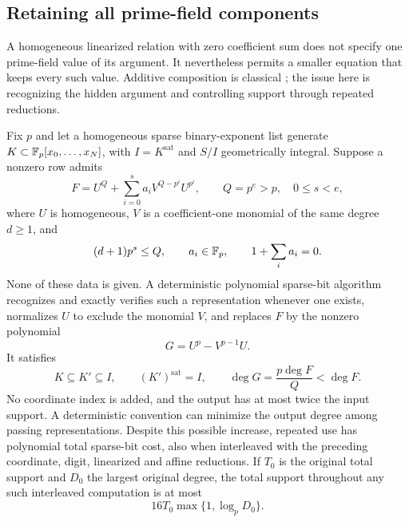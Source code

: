 \subsection{Retaining all prime-field components}
A homogeneous linearized relation with zero coefficient sum does not
specify one prime-field value of its argument. It nevertheless permits
a smaller equation that keeps every such value. Additive composition
is classical \citep[\S6]{sp-giesbrecht}; the issue here is recognizing
the hidden argument and controlling support through repeated reductions.

\begin{theorem}
\label{sp:thm:zero-sum-preprocessing}
Fix $p$ and let a homogeneous sparse binary-exponent list generate
$K\subset\mathbb F_p[x_0,\ldots,x_N]$, with $I=K^{\mathrm{sat}}$ and $S/I$
geometrically integral. Suppose a nonzero row admits
\[
 F=U^Q+\sum_{i=0}^{s}a_i V^{Q-p^i}U^{p^i},
 \qquad Q=p^e>p,\quad 0\le s<e,
\]
where $U$ is homogeneous, $V$ is a coefficient-one monomial of the
same degree $d\ge1$, and
\[
 (d+1)p^s\le Q,\qquad a_i\in\mathbb F_p,
 \qquad 1+\sum_i a_i=0.
\]
None of these data is given. A deterministic polynomial sparse-bit
algorithm recognizes and exactly verifies such a representation whenever
one exists, normalizes $U$ to exclude the monomial $V$, and replaces
$F$ by the nonzero polynomial
\begin{equation}
 G=U^p-V^{p-1}U.
 \label{sp:eq:zero-sum-output}
\end{equation}
It satisfies
\[
 K\subseteq K'\subseteq I,
 \qquad (K')^{\mathrm{sat}}=I,
 \qquad \deg G=\frac{p\deg F}{Q}<\deg F.
\]
No coordinate index is added, and the output has at most twice the
input support. A deterministic convention can minimize the output
degree among passing representations. Despite this possible increase,
repeated use has polynomial total sparse-bit cost, also when
interleaved with the preceding coordinate, digit, linearized and
affine reductions. If $T_0$ is the original total support and $D_0$
the largest original degree, the total support throughout any such
interleaved computation is at most
\[
 16T_0\max\{1,\log_p D_0\}.
\]
\end{theorem}
